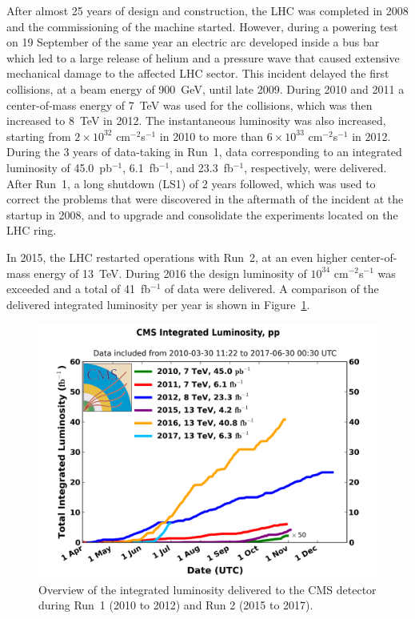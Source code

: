 After almost 25 years of design and construction, the \ac{LHC} was completed in 2008 and the commissioning of the machine started. However, during a powering test on 19 September of the same year an electric arc developed inside a bus bar which led to a large release of helium and a pressure wave that caused extensive mechanical damage to the affected LHC sector. This incident delayed the first collisions, at a beam energy of \SI{900}{GeV}, until late 2009. During 2010 and 2011 a center-of-mass energy of \SI{7}{TeV} was used for the collisions, which was then increased to \SI{8}{TeV} in 2012. The instantaneous luminosity was also increased, starting from $2 \times 10^{32}$ cm$^{-2}$s$^{-1}$ in 2010 to more than $6 \times 10^{33}$ cm$^{-2}$s$^{-1}$ in 2012. During the 3 years of data-taking in Run~1, data corresponding to an integrated luminosity of 45.0~pb$^{-1}$, 6.1~fb$^{-1}$, and 23.3~fb$^{-1}$, respectively, were delivered. After Run~1, a long shutdown (LS1) of 2 years followed, which was used to correct the problems that were discovered in the aftermath of the incident at the startup in 2008, and to upgrade and consolidate the experiments located on the \ac{LHC} ring.

In 2015, the \ac{LHC} restarted operations with Run~2, at an even higher center-of-mass energy of \SI{13}{TeV}. During 2016 the design luminosity of $10^{34}$ cm$^{-2}$s$^{-1}$ was exceeded and a total of 41~fb$^{-1}$ of data were delivered. A comparison of the delivered integrated luminosity per year is shown in Figure~\ref{fig:lumi}.

\begin{figure}[ht]
  \centering
 \includegraphics[width=.75\textwidth]{CMS_lumi_allyears}
 \caption{Overview of the integrated luminosity delivered to the CMS detector during Run~1 (2010 to 2012) and Run 2 (2015 to 2017).}
 \label{fig:lumi}
\end{figure}

